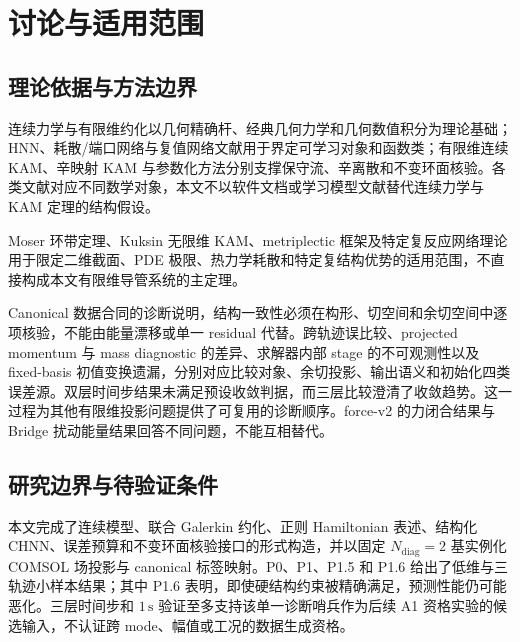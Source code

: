 \section{讨论与适用范围}\label{sec:discussion}

\subsection{理论依据与方法边界}\label{sec:discussion-7-1}

连续力学与有限维约化以几何精确杆、经典几何力学和几何数值积分为理论基础；HNN、耗散/端口网络与复值网络文献用于界定可学习对象和函数类；有限维连续 KAM、辛映射 KAM 与参数化方法分别支撑保守流、辛离散和不变环面核验。各类文献对应不同数学对象，本文不以软件文档或学习模型文献替代连续力学与 KAM 定理的结构假设。\cite{Simo1985FiniteStrainBeam,Antman2005Elasticity,MarsdenRatiu1999MechanicsSymmetry,HairerLubichWanner2006GNI,Greydanus2019HNN,Zhong2020Dissipative,Desai2021PHNN,Chen2022KAMSLT,Trabelsi2018DeepComplex,Hirose2012CVNN,FengQin2010,Shang1999KAMAlgorithms,Shang2000KAMMappings,Haro2016Parameterization,Arnold1989ClassicalMechanics,Poschel2001KAMLecture}

Moser 环带定理、Kuksin 无限维 KAM、metriplectic 框架及特定复反应网络理论用于限定二维截面、PDE 极限、热力学耗散和特定复结构优势的适用范围，不直接构成本文有限维导管系统的主定理。\cite{Coquinot2020Metriplectic,Moser1962InvariantCurves,Kuksin1993InfiniteDimensionalKAM,Poschel2001KAMLecture,Zhang2022ComplexReaction}

Canonical 数据合同的诊断说明，结构一致性必须在构形、切空间和余切空间中逐项核验，不能由能量漂移或单一 residual 代替。跨轨迹误比较、projected momentum 与 mass diagnostic 的差异、求解器内部 stage 的不可观测性以及 fixed-basis 初值变换遗漏，分别对应比较对象、余切投影、输出语义和初始化四类误差源。双层时间步结果未满足预设收敛判据，而三层比较澄清了收敛趋势。这一过程为其他有限维投影问题提供了可复用的诊断顺序。force-v2 的力闭合结果与 Bridge 扰动能量结果回答不同问题，不能互相替代。

\subsection{研究边界与待验证条件}\label{sec:discussion-7-2}

本文完成了连续模型、联合 Galerkin 约化、正则 Hamiltonian 表述、结构化 CHNN、误差预算和不变环面核验接口的形式构造，并以固定 \(N_{\mathrm{diag}}=2\) 基实例化 COMSOL 场投影与 canonical 标签映射。P0、P1、P1.5 和 P1.6 给出了低维与三轨迹小样本结果；其中 P1.6 表明，即使硬结构约束被精确满足，预测性能仍可能恶化。三层时间步和 \(1\,\mathrm{s}\) 验证至多支持该单一诊断哨兵作为后续 A1 资格实验的候选输入，不认证跨 mode、幅值或工况的数据生成资格。

